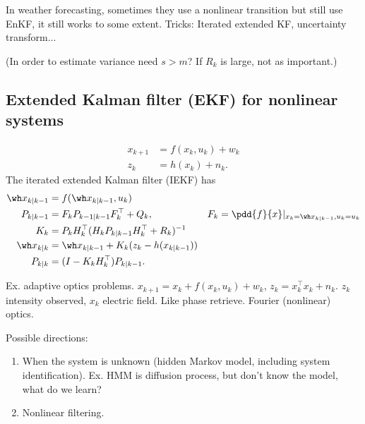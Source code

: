 In weather forecasting, sometimes they use a nonlinear transition but still use EnKF, it still works to some extent.
Tricks: 
Iterated extended KF, uncertainty transform...

(In order to estimate variance need $s>m$? If $R_k$ is large, not as important.) %


\subsection{Extended Kalman filter (EKF) for nonlinear systems}

\begin{align}
x_{k+1}&=f(x_k,u_k) + w_k\\
z_k &=h(x_k) + n_k.
\end{align}
The iterated extended Kalman filter (IEKF) has
\begin{align}
\wh x_{k|k-1}
&= f(\wh x_{k|k-1},u_k)\\
P_{k|k-1} &= F_k P_{k-1|k-1}F_k^\top + Q_k,& F_k=\pdd{f}{x}|_{x_k=\wh x_{k|k-1}, u_k = u_k}\\
K_k &= P_kH_k^\top (H_k P_{k|k-1}H_k^\top + R_k)^{-1}\\
\wh x_{k|k}&= \wh x_{k|k-1} + K_k(z_k - h(x_{k|k-1}))\\
P_{k|k}&=(I-K_kH_k^\top)P_{k|k-1}.
\end{align}

Ex. adaptive optics problems. $x_{k+1}=x_k + f(x_k,u_k)+w_k$, $z_k =x_k^\top x_k + n_k$. %
$z_k$ intensity observed, $x_k$ electric field. Like phase retrieve. Fourier (nonlinear) optics.

Possible directions: 
\begin{enumerate}
\item
When the system is unknown (hidden Markov model, including system identification). Ex. HMM is diffusion process, but don't know the model, what do we learn?
\item
Nonlinear filtering.
\end{enumerate}


